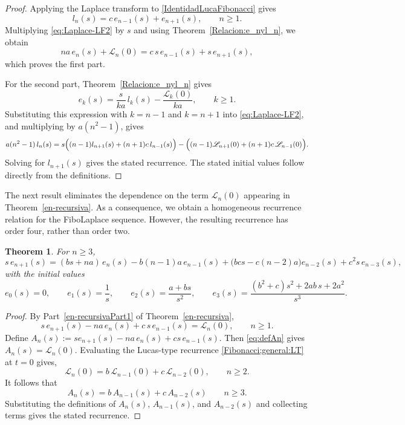 \documentclass[11pt]{amsart}
\newcommand{\Lt}[1]{\mathscr{L}_{#1}}
\theoremstyle{plain}
\numberwithin{equation}{section}
\newtheorem{theorem}[thm]{Theorem}
\begin{document}
\begin{proof}
Applying the Laplace transform to
\eqref{IdentidadLucaFibonacci} gives
\begin{equation}\label{eq:Laplace-LF2}
l_n(s)=c\,e_{n-1}(s)+e_{n+1}(s), \qquad n\geq 1.
\end{equation}
Multiplying \eqref{eq:Laplace-LF2} by $s$ and using Theorem~\ref{Relacion:e_nyl_n}, we obtain
\[
na\,e_n(s)+\Lt{n}(0)=c\,s\,e_{n-1}(s)+s\,e_{n+1}(s),
\]
which proves the first part.

For the second part, Theorem~\ref{Relacion:e_nyl_n} gives
\begin{equation*}
e_k(s)=\frac{s}{ka}\,l_k(s)-\frac{\Lt{k}(0)}{ka}, \qquad k\geq 1.
\end{equation*}
Substituting this expression with $k=n-1$ and $k=n+1$ into \eqref{eq:Laplace-LF2}, and multiplying by $a(n^2-1)$, gives
\[
a(n^2-1)\,l_n(s)
= s\Bigl((n-1)l_{n+1}(s)+(n+1)c\,l_{n-1}(s)\Bigr)
-\Bigl((n-1)\Lt{n+1}(0)+(n+1)c\,\Lt{n-1}(0)\Bigr).
\]
Solving for $l_{n+1}(s)$ gives the stated recurrence.  The stated initial values follow directly from the definitions.
\end{proof}

The next result eliminates the dependence on the term $\Lt{n}(0)$ appearing in Theorem~\ref{en-recursiva}. As a consequence, we obtain a homogeneous recurrence relation for the FiboLaplace sequence. However, the resulting recurrence has order four, rather than order two.

\begin{theorem}\label{thm:en-4term}
For $n\ge 3$,
\[
s\,e_{n+1}(s)
=(bs+na)\,e_n(s)
-b(n-1)a\,e_{n-1}(s)
+\bigl(bcs-c(n-2)a\bigr)e_{n-2}(s)
+c^{2}s\,e_{n-3}(s),
\]
with the initial values
\[
e_0(s)=0,\qquad e_1(s)=\frac{1}{s},\qquad e_2(s)=\frac{a+bs}{s^2},\qquad
e_3(s)=\frac{(b^2+c)s^2+2ab\,s+2a^2}{s^3}.
\]
\end{theorem}
\begin{proof}
By Part~\ref{en-recursivaPart1} of Theorem~\ref{en-recursiva}, 
\begin{equation}\label{eq:defAn}
s\,e_{n+1}(s)-na\,e_n(s)+c\,s\,e_{n-1}(s)=\Lt{n}(0), \qquad n\geq 1.
\end{equation}
Define $A_n(s):=s e_{n+1}(s)-na\,e_n(s)+cs\,e_{n-1}(s)$. Then \eqref{eq:defAn} gives $A_n(s)=\Lt{n}(0)$. Evaluating the Lucas-type recurrence \eqref{Fibonacci;general:LT} at $t=0$ gives, 
\[
\Lt{n}(0)=b\,\Lt{n-1}(0)+c\,\Lt{n-2}(0), \qquad n\geq 2.
\]
It follows that
\[
A_n(s)=b\,A_{n-1}(s)+c\,A_{n-2}(s)\qquad n\geq 3.
\]
Substituting the definitions of $A_n(s)$, $A_{n-1}(s)$, and $A_{n-2}(s)$ and collecting terms gives the stated recurrence.
\end{proof}
\end{document}
